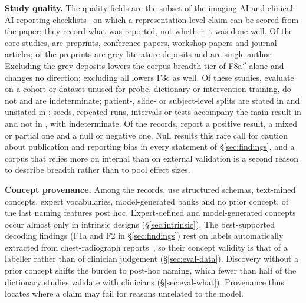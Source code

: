\textbf{Study quality.} The quality fields are the subset of the imaging-AI and clinical-AI reporting
checklists~\cite{mongan2020claim,norgeot2020minimum} on which a representation-level claim can be scored
from the paper; they record what was reported, not whether it was done well. Of the \Ncore{} core
studies, \Npreprint{} are preprints, \Nconf{} conference papers, \Nwork{} workshop papers and \Njour{}
journal articles; \Ngrey{} of the preprints are grey-literature deposits and \Nsingle{} are
single-author. Excluding the grey deposits lowers the corpus-breadth tier of F8a$''$ alone and changes
no direction; excluding all \Ngreysingle{} lowers F3c as well. Of these studies, \Nextyes{} evaluate on a cohort or
dataset unused for probe, dictionary or intervention training, \Nextno{} do not and \Nextunk{} are
indeterminate; patient-, slide- or subject-level splits are stated in \Nsplityes{} and unstated in
\Nsplitno{}; seeds, repeated runs, intervals or tests accompany the main result in \Nseedyes{} and not
in \Nseedno{}, with \Nseedunk{} indeterminate. Of the \Nclaims{} records, \Ndirpos{} report a positive
result, \Ndirmix{} a mixed or partial one and \Ndirnull{} a null or negative one. Null results this rare
call for caution about publication and reporting bias in every statement of \S\ref{sec:findings}, and a
corpus that relies more on internal than on external validation is a second reason to describe breadth
rather than to pool effect sizes.

\textbf{Concept provenance.} Among the records, \Nprovlabel{} use structured schemas, \Nprovtext{}
text-mined concepts, \Nprovexpert{} expert vocabularies, \Nprovmodel{} model-generated banks and
\Nprovnone{} no prior concept, \Nposthocname{} of the last naming features post hoc. Expert-defined and
model-generated concepts occur almost only in intrinsic designs (\S\ref{sec:intrinsic}). The
best-supported decoding findings (F1a and F2 in \S\ref{sec:findings}) rest on labels automatically
extracted from chest-radiograph reports~\cite{irvin2019chexpert,johnson2019mimicjpg}, so their concept
validity is that of a labeller rather than of clinician judgement (\S\ref{sec:eval-data}). Discovery
without a prior concept shifts the burden to post-hoc naming, which fewer than half of the dictionary
studies validate with clinicians (\S\ref{sec:eval-what}). Provenance thus locates where a claim may fail
for reasons unrelated to the model.
